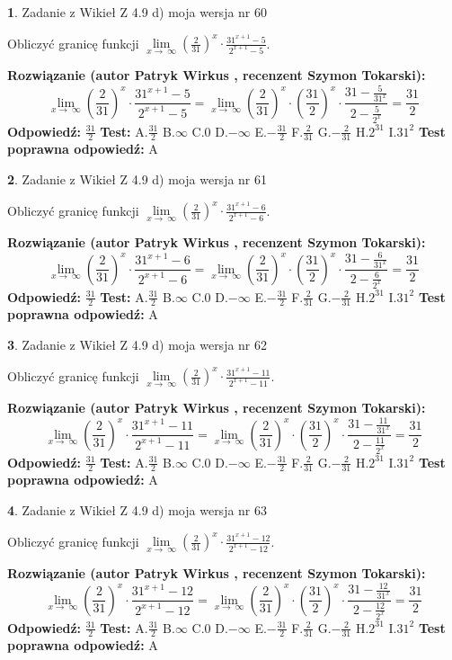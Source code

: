 \documentclass[12pt, a4paper]{article}
\theoremstyle{definition} %
\newtheorem{zad}{}
\newcommand{\zadStart}[1]{\begin{zad}#1\newline}
\newcommand{\zadStop}{\end{zad}}
\newcommand{\rozwStart}[2]{\noindent \textbf{Rozwiązanie (autor #1 , recenzent #2): }\newline}
\newcommand{\rozwStop}{\newline}
\newcommand{\odpStart}{\noindent \textbf{Odpowiedź:}\newline}
\newcommand{\odpStop}{\newline}
\newcommand{\testStart}{\noindent \textbf{Test:}\newline}
\newcommand{\testStop}{\newline}
\newcommand{\kluczStart}{\noindent \textbf{Test poprawna odpowiedź:}\newline}
\newcommand{\kluczStop}{\newline}
\begin{document}
\zadStart{Zadanie z Wikieł Z 4.9 d) moja wersja nr 60}


Obliczyć granicę funkcji  $\lim\limits_{x\to\ \infty}(\frac{2}{31})^{x}\cdot\frac{31^{x+1}-5}{2^{x+1}-5}$.
\zadStop
\rozwStart{Patryk Wirkus}{Szymon Tokarski}
$$\lim\limits_{x\to\ \infty}(\frac{2}{31})^{x}\cdot\frac{31^{x+1}-5}{2^{x+1}-5}=\lim\limits_{x\to\ \infty}(\frac{2}{31})^{x}\cdot(\frac{31}{2})^{x} \cdot \frac{31-\frac{5}{31^{x}}}{2-\frac{5}{2^{x}}} = \frac{31}{2}$$
\rozwStop
\odpStart
$\frac{31}{2}$
\odpStop
\testStart
A.$\frac{31}{2}$ B.$\infty$ C.$0$ D.$-\infty$ E.$-\frac{31}{2}$
F.$\frac{2}{31}$ G.$-\frac{2}{31}$
H.$2^{31}$
I.$31^{2}$
\testStop
\kluczStart
A
\kluczStop



\zadStart{Zadanie z Wikieł Z 4.9 d) moja wersja nr 61}


Obliczyć granicę funkcji  $\lim\limits_{x\to\ \infty}(\frac{2}{31})^{x}\cdot\frac{31^{x+1}-6}{2^{x+1}-6}$.
\zadStop
\rozwStart{Patryk Wirkus}{Szymon Tokarski}
$$\lim\limits_{x\to\ \infty}(\frac{2}{31})^{x}\cdot\frac{31^{x+1}-6}{2^{x+1}-6}=\lim\limits_{x\to\ \infty}(\frac{2}{31})^{x}\cdot(\frac{31}{2})^{x} \cdot \frac{31-\frac{6}{31^{x}}}{2-\frac{6}{2^{x}}} = \frac{31}{2}$$
\rozwStop
\odpStart
$\frac{31}{2}$
\odpStop
\testStart
A.$\frac{31}{2}$ B.$\infty$ C.$0$ D.$-\infty$ E.$-\frac{31}{2}$
F.$\frac{2}{31}$ G.$-\frac{2}{31}$
H.$2^{31}$
I.$31^{2}$
\testStop
\kluczStart
A
\kluczStop



\zadStart{Zadanie z Wikieł Z 4.9 d) moja wersja nr 62}


Obliczyć granicę funkcji  $\lim\limits_{x\to\ \infty}(\frac{2}{31})^{x}\cdot\frac{31^{x+1}-11}{2^{x+1}-11}$.
\zadStop
\rozwStart{Patryk Wirkus}{Szymon Tokarski}
$$\lim\limits_{x\to\ \infty}(\frac{2}{31})^{x}\cdot\frac{31^{x+1}-11}{2^{x+1}-11}=\lim\limits_{x\to\ \infty}(\frac{2}{31})^{x}\cdot(\frac{31}{2})^{x} \cdot \frac{31-\frac{11}{31^{x}}}{2-\frac{11}{2^{x}}} = \frac{31}{2}$$
\rozwStop
\odpStart
$\frac{31}{2}$
\odpStop
\testStart
A.$\frac{31}{2}$ B.$\infty$ C.$0$ D.$-\infty$ E.$-\frac{31}{2}$
F.$\frac{2}{31}$ G.$-\frac{2}{31}$
H.$2^{31}$
I.$31^{2}$
\testStop
\kluczStart
A
\kluczStop



\zadStart{Zadanie z Wikieł Z 4.9 d) moja wersja nr 63}


Obliczyć granicę funkcji  $\lim\limits_{x\to\ \infty}(\frac{2}{31})^{x}\cdot\frac{31^{x+1}-12}{2^{x+1}-12}$.
\zadStop
\rozwStart{Patryk Wirkus}{Szymon Tokarski}
$$\lim\limits_{x\to\ \infty}(\frac{2}{31})^{x}\cdot\frac{31^{x+1}-12}{2^{x+1}-12}=\lim\limits_{x\to\ \infty}(\frac{2}{31})^{x}\cdot(\frac{31}{2})^{x} \cdot \frac{31-\frac{12}{31^{x}}}{2-\frac{12}{2^{x}}} = \frac{31}{2}$$
\rozwStop
\odpStart
$\frac{31}{2}$
\odpStop
\testStart
A.$\frac{31}{2}$ B.$\infty$ C.$0$ D.$-\infty$ E.$-\frac{31}{2}$
F.$\frac{2}{31}$ G.$-\frac{2}{31}$
H.$2^{31}$
I.$31^{2}$
\testStop
\kluczStart
A
\kluczStop
\end{document}
